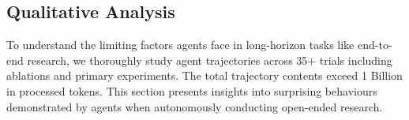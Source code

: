 \documentclass[11pt]{article}
\newcommand{\kw}[1]{{\textsc{\MakeLowercase{#1}}}}
\theoremstyle{plain}
\theoremstyle{definition}
\theoremstyle{remark}
\begin{document}
\subsection{Qualitative Analysis} \label{sec:qual-tative-analysis} 

To understand the limiting factors agents face in long-horizon tasks like end-to-end research, we thoroughly study agent trajectories across 35+ trials including ablations and primary experiments. The total trajectory contents exceed 1 Billion in processed tokens. This section presents insights into surprising behaviours demonstrated by agents when autonomously conducting open-ended research.






\end{document}
